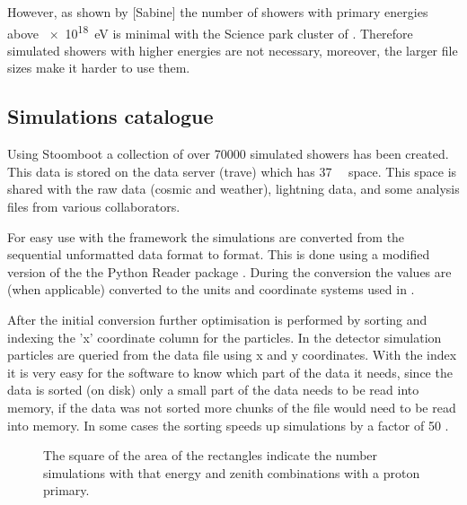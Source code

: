However, as shown by [Sabine] the number of showers with primary
energies above \SI{e18}{\electronvolt} is minimal with the Science park
cluster of \hisparc. Therefore simulated showers with higher energies
are not necessary, moreover, the larger file sizes make it harder to
use them.


\subsection{Simulations catalogue}

Using Stoomboot a collection of over \num{70000} simulated showers has
been created. This data is stored on the \hisparc data server (trave)
which has \SI{37}{\tera\byte} space. This space is shared with the raw
\hisparc data (cosmic and weather), \knmi lightning data, and some
analysis files from various \hisparc collaborators.

For easy use with the \sapphire framework the \corsika simulations are
converted from the sequential unformatted \fortran data format to \hdf
format. This is done using a modified version of the the Python \corsika
Reader package \cite{gonzalez2011}. During the conversion the values are
(when applicable) converted to the units and coordinate systems used in
.

After the initial conversion further optimisation is performed by
sorting and indexing the 'x' coordinate column for the particles. In the
detector simulation particles are queried from the \corsika data file
using x and y coordinates. With the index it is very easy for the
software to know which part of the data it needs, since the data is
sorted (on disk) only a small part of the data needs to be read into
memory, if the data was not sorted more chunks of the file would need to
be read into memory. In some cases the sorting speeds up simulations by
a factor of 50 \cite{pytables:optimization}.


\begin{figure}
    \centering
    
    \caption{ The square of the
             area of the rectangles indicate the number simulations with
             that energy and zenith combinations with a proton primary.}
    \label{fig:simulations_proton_energy_zenith}
\end{figure}


